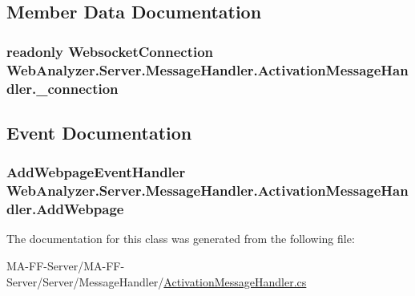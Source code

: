 \subsection{Member Data Documentation}
\hypertarget{class_web_analyzer_1_1_server_1_1_message_handler_1_1_activation_message_handler_a72e20f23d13fafc255e8e860bfe8f8fa}{}
\subsubsection[{\+\_\+connection}]{\setlength{\rightskip}{0pt plus 5cm}readonly {\bf Websocket\+Connection} Web\+Analyzer.\+Server.\+Message\+Handler.\+Activation\+Message\+Handler.\+\_\+connection\hspace{0.3cm}{\ttfamily [private]}}\label{class_web_analyzer_1_1_server_1_1_message_handler_1_1_activation_message_handler_a72e20f23d13fafc255e8e860bfe8f8fa}


\subsection{Event Documentation}
\hypertarget{class_web_analyzer_1_1_server_1_1_message_handler_1_1_activation_message_handler_aeab84864e057b34b024a8b8a11f3e135}{}
\subsubsection[{Add\+Webpage}]{\setlength{\rightskip}{0pt plus 5cm}Add\+Webpage\+Event\+Handler Web\+Analyzer.\+Server.\+Message\+Handler.\+Activation\+Message\+Handler.\+Add\+Webpage}\label{class_web_analyzer_1_1_server_1_1_message_handler_1_1_activation_message_handler_aeab84864e057b34b024a8b8a11f3e135}


The documentation for this class was generated from the following file\+:\begin{DoxyCompactItemize}
\item 
M\+A-\/\+F\+F-\/\+Server/\+M\+A-\/\+F\+F-\/\+Server/\+Server/\+Message\+Handler/\hyperlink{_activation_message_handler_8cs}{Activation\+Message\+Handler.\+cs}\end{DoxyCompactItemize}
